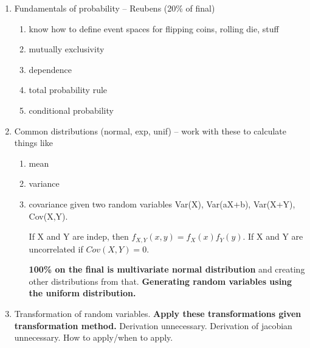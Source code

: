 \documentclass{report}
\begin{document}
 \begin{enumerate}
 \item Fundamentals of probability -- Reubens  (20\% of final) \begin{enumerate}

\item   know how to define event spaces for flipping coins, rolling die, stuff
 \item mutually exclusivity
 \item dependence
 \item total probability rule
 \item conditional probability
\end{enumerate}

 \item Common distributions (normal, exp, unif) -- work with these to calculate things like 
  \begin{enumerate}
 \item mean
 \item variance
 \item covariance given two random variables
 Var(X), Var(aX+b), Var(X+Y), Cov(X,Y). 
 
 If X and Y are indep, then $f_{X,Y}(x,y) = f_X(x)f_Y(y)$. If X and Y are uncorrelated if $Cov(X,Y)=0$.
 
 \textbf{100\% on the final is multivariate normal distribution} and creating other distributions from that. \textbf{Generating random variables using the uniform distribution. }
 \end{enumerate}

 \item Transformation of random variables. \textbf{Apply these transformations given transformation method.} Derivation unnecessary. Derivation of jacobian unnecessary. How to apply/when to apply.
  

\end{enumerate}
\end{document}
